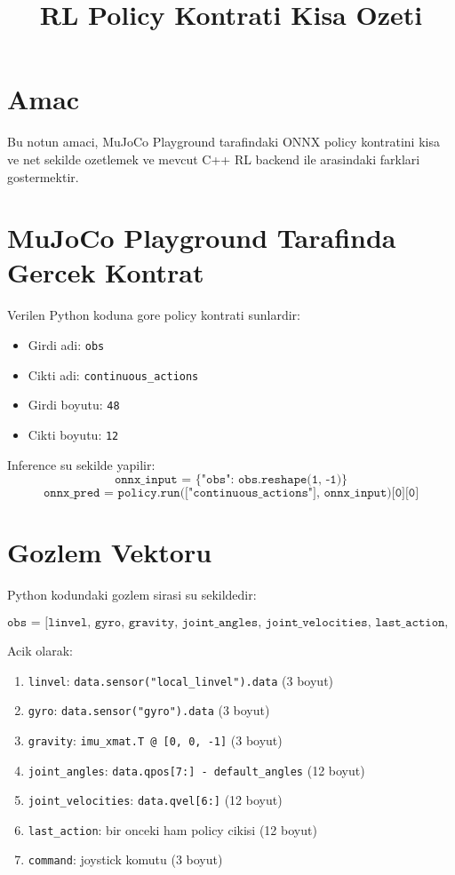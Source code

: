 \documentclass[11pt,a4paper]{article}
\title{RL Policy Kontrati Kisa Ozeti}
\author{}
\date{}
\begin{document}
  \maketitle

  \section*{Amac}
  Bu notun amaci, MuJoCo Playground tarafindaki ONNX policy kontratini kisa ve net sekilde ozetlemek ve mevcut C++ RL backend ile arasindaki farklari gostermektir.

  \section*{MuJoCo Playground Tarafinda Gercek Kontrat}
  Verilen Python koduna gore policy kontrati sunlardir:

  \begin{itemize}
  \item Girdi adi: \texttt{obs}
  \item Cikti adi: \texttt{continuous\_actions}
  \item Girdi boyutu: \texttt{48}
  \item Cikti boyutu: \texttt{12}
  \end{itemize}

  Inference su sekilde yapilir:
  \[
  \texttt{onnx\_input = \{"obs": obs.reshape(1, -1)\}}
  \]
  \[
  \texttt{onnx\_pred = policy.run(["continuous\_actions"], onnx\_input)[0][0]}
  \]

  \section*{Gozlem Vektoru}
  Python kodundaki gozlem sirasi su sekildedir:

  \[
  \texttt{obs = [linvel,\ gyro,\ gravity,\ joint\_angles,\ joint\_velocities,\ last\_action,\ command]}
  \]

  Acik olarak:

  \begin{enumerate}
  \item \texttt{linvel}: \texttt{data.sensor("local\_linvel").data} \hfill (3 boyut)
  \item \texttt{gyro}: \texttt{data.sensor("gyro").data} \hfill (3 boyut)
  \item \texttt{gravity}: \texttt{imu\_xmat.T @ [0, 0, -1]} \hfill (3 boyut)
  \item \texttt{joint\_angles}: \texttt{data.qpos[7:] - default\_angles} \hfill (12 boyut)
  \item \texttt{joint\_velocities}: \texttt{data.qvel[6:]} \hfill (12 boyut)
  \item \texttt{last\_action}: bir onceki ham policy cikisi \hfill (12 boyut)
  \item \texttt{command}: joystick komutu \hfill (3 boyut)
  \end{enumerate}
\end{document}
